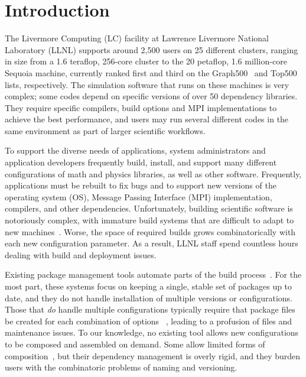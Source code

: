 
\section{Introduction}
\label{sec:intro}

The Livermore Computing (LC) facility at Lawrence Livermore National Laboratory
(LLNL) supports around 2,500 users on 25 different clusters, ranging 
in size from a 1.6 teraflop, 256-core cluster to the
20 petaflop, 1.6 million-core Sequoia machine, currently ranked first and
third on the Graph500~\cite{graph500} and Top500~\cite{top500}
lists, respectively.
%
%
The simulation software that runs on these machines is very complex; some
codes depend on specific versions of over 50 dependency libraries.
They require specific compilers, build options and MPI implementations to
achieve the best performance, and users may run several
different codes in the same environment as part of larger 
scientific workflows.

To support the diverse needs of applications, system administrators 
and application developers 
frequently build, install, and support many different configurations
of math and physics libraries, as well as other software.
Frequently, applications must be rebuilt to fix bugs and to support
new versions of the operating system (OS), Message Passing Interface (MPI)
implementation, compilers, and other dependencies. 
Unfortunately, building scientific software is notoriously complex, with
immature build systems that are difficult to adapt to new
machines~\cite{dubois+:comp-sci-eng,hoste+:pyhpc12,wilson+:corr}.
Worse, the space of required builds grows combinatorically
with each new configuration parameter. As a result, LLNL staff
spend countless hours dealing with build and deployment issues.

Existing package management tools automate parts of the build 
process~\cite{bsdports,digirolamo:smithy,dolstra+:icfp08,dolstra+:lisa04,hashdist,homebrew,hoste+:pyhpc12,macports,thiruvathukal:gentoo04}.
For the most part, these systems focus on keeping a single, stable set of 
packages up to date, and they do not handle installation of multiple
versions or configurations.  Those that {\it do} handle multiple configurations
typically require that package files be created for each combination of 
options~ \cite{digirolamo:smithy,dolstra+:icfp08,dolstra+:lisa04,hashdist,hoste+:pyhpc12}, 
leading to a profusion of files and maintenance issues.
To our knowledge, no existing tool allows new configurations to be composed
and assembled on demand.  Some allow limited forms of 
composition~\cite{hoste+:pyhpc12,dolstra+:icfp08,dolstra+:lisa04}, but their
dependency management is overly rigid, and they burden users with
the combinatoric problems of naming and versioning.

